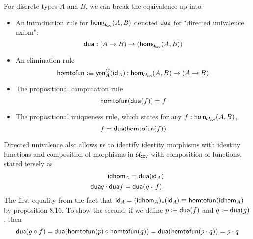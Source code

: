 \documentclass[main.tex]{subfiles}
\begin{document}
For discrete types $A$ and $B$, we can break the equivalence up into:
\begin{itemize}
    \item An introduction rule for $\ho[\uc]{A}{B}$ denoted $\dua$ for "directed univalence axiom":
    $$\dua : (A \to B) \to (\ho[\uc]{A}{B})$$
    \item An elimination rule
    $$\htf \defeq \yon{C}{A}(\id{A}) : \ho[\uc]{A}{B} \to (A \to B)$$
    \item The propositional computation rule
        $$\htf(\dua(f)) = f$$
    \item The propositional uniqueness rule, which states for any $f : \ho[\uc]{A} {B}$,
    $$f = \dua(\htf(f))$$
\end{itemize}
Directed univalence also allows us to  identify identity morphisms with identity functions and composition of morphisms in $\uc$ with composition of functions, stated tersely as
\begin{align*}
    \idhom{A} = \dua(\id{A})\\
    \dua{g}\cdot\dua{f} = \dua(g \circ f).
\end{align*}
The first equality from the fact that $\id{A} = (\idhom{A})_*(\id{A}) \equiv \htf(\idhom{A})$ by proposition 8.16. To show the second, if we define $p \defeq \dua(f)$ and $q \defeq \dua(g)$, then
    $$\dua(g \circ f) = \dua(\htf(p) \circ \htf(q)) = \dua(\htf(p \cdot q)) = p \cdot q$$
\end{document}
